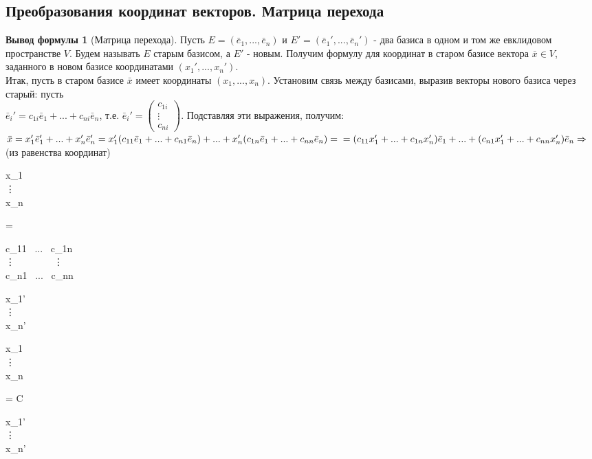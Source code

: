 \documentclass[a4paper, 12pt]{article}
\theoremstyle{definition}
\newtheorem*{formula}{Вывод формулы}
\newenvironment{boxedalign*}
  {\begin{equation*}\begin{lrbox}{\boxedalignbox}$\begin{aligned}}
  {\end{aligned}$\end{lrbox}\fbox{\usebox{\boxedalignbox}}\end{equation*}}
\begin{document}
	\subsection{Преобразования координат векторов. Матрица перехода}
	\begin{formula}[Матрица перехода]
		Пусть $E = (\bar{e}_{1},...,\bar{e}_{n})$ и $E' = (\bar{e}_{1}',...,\bar{e}_{n}')$ - два базиса в одном и том же евклидовом пространстве $V$. Будем называть $E$ старым базисом, а $E'$ - новым. Получим формулу для координат в старом базисе вектора $\bar{x}\in V$, заданного в новом базисе координатами $(x_{1}',...,x_{n}')$.\\
		Итак, пусть в старом базисе $\bar{x}$ имеет координаты $(x_{1},...,x_{n})$. Установим связь между базисами, выразив векторы нового базиса через старый: пусть \\ $\bar{e}_{i}' = c_{1i}\bar{e}_{1} + ... + c_{ni}\bar{e}_{n}$, т.е. $\bar{e}_{i}' = \begin{pmatrix} c_{1i} \\ \vdots \\ c_{ni} \end{pmatrix}$. Подставляя эти выражения, получим:\\ $\bar{x} = x_{1}'\bar{e}_{1}' + ... + x_{n}'\bar{e}_{n}' = x_{1}'(c_{11}\bar{e}_{1} +...+ c_{n1}\bar{e}_{n}) +...+ x_{n}'(c_{1n}\bar{e}_{1} +...+ c_{nn}\bar{e}_{n}) = \\=(c_{11}x_{1}'+...+c_{1n}x_{n}')\bar{e}_{1} +...+(c_{n1}x_{1}'+...+c_{nn}x_{n}')\bar{e}_{n} \Rightarrow \ $(из равенства координат)  \begin{boxedalign*}\begin{pmatrix} x_{1} \\ \vdots \\ x_{n} \end{pmatrix} = \begin{pmatrix} c_{11} \ ... \ c_{1n} \\ \vdots \ \ \ \ \ \ \ \ \vdots \\ c_{n1} \ ... \ c_{nn} \end{pmatrix} \begin{pmatrix} x_{1}' \\ \vdots \\ x_{n}' \end{pmatrix} \Leftrightarrow \begin{pmatrix} x_{1} \\ \vdots \\ x_{n} \end{pmatrix} = C\begin{pmatrix} x_{1}' \\ \vdots \\ x_{n}' \end{pmatrix}\end{boxedalign*} 
	\end{formula}
\end{document}
